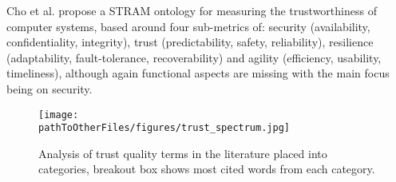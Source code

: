 Cho et al. propose a STRAM ontology for measuring the trustworthiness of computer systems, based around four sub-metrics of: security (availability, confidentiality, integrity), trust (predictability, safety, reliability), resilience (adaptability, fault-tolerance, recoverability) and agility (efficiency, usability, timeliness), although again functional aspects are missing with the main focus being on security.

\begin{figure*}[]
    \centering
    \texttt{[image: \\pathToOtherFiles/figures/trust\_spectrum.jpg]}
    \caption{Analysis of trust quality terms in the literature placed into categories, breakout box shows most cited words from each category.}
    \label{fig:trust_spectrum}
\end{figure*}


